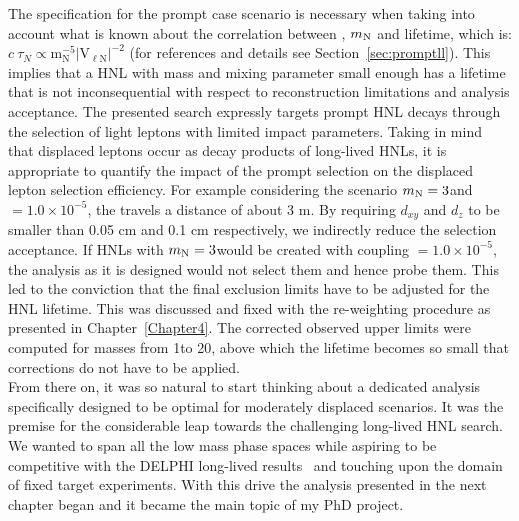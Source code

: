 The specification for the prompt case scenario is necessary when taking
into account what is known about the correlation between \mixpar, $
m_\mathrm{N} $ and \hnl lifetime, which is: $c\:\tau_{N}
\propto\mathrm{m_{N}^{-5}|V_{\ell N}|^{-2}}$ (for references and
details see Section~\ref{sec:promptll}). This implies that a HNL with
mass and mixing parameter small enough has a lifetime that
is not inconsequential with respect to reconstruction limitations and 
analysis acceptance. The presented search expressly targets prompt
HNL decays through the selection of light leptons with 
limited impact parameters. Taking in mind that displaced leptons occur as decay
products of long-lived HNLs, it is appropriate to quantify the impact of the
prompt selection on the displaced lepton selection
efficiency. For example considering the scenario $m_\mathrm{N} = 3$\GeV and 
\mixparm $= 1.0\times 10^{-5}$, the \hnl travels a distance
of about 3 m. By requiring $d_{xy}$ and $d_z$ to
be smaller than 0.05 cm and 0.1 cm respectively, we indirectly reduce
the selection acceptance. If HNLs with $m_\mathrm{N} = 3$\GeV would be created with
coupling \mixparm $= 1.0\times 10^{-5}$, the analysis as it is
designed would not select them and hence probe them. This led to the conviction that the final
exclusion limits have to be adjusted for the HNL lifetime. This was
discussed and fixed with the re-weighting procedure as presented in
Chapter~\ref{Chapter4}. The corrected observed upper limits were
computed for masses from 1\GeV to 20\GeV, above which the lifetime
becomes so small that corrections do not have to be applied.\\
From there on, it was so natural to start thinking about a dedicated
analysis specifically designed to be optimal for moderately displaced scenarios. It
was the premise for the considerable leap towards the
challenging long-lived HNL search. We wanted to span all the
low mass phase spaces while aspiring to be competitive with the DELPHI
long-lived results~\cite{Abreu:1996pa} and touching upon the domain of
fixed target experiments. With this drive the analysis presented in
the next chapter began and it became the main topic of my PhD
project.\\

